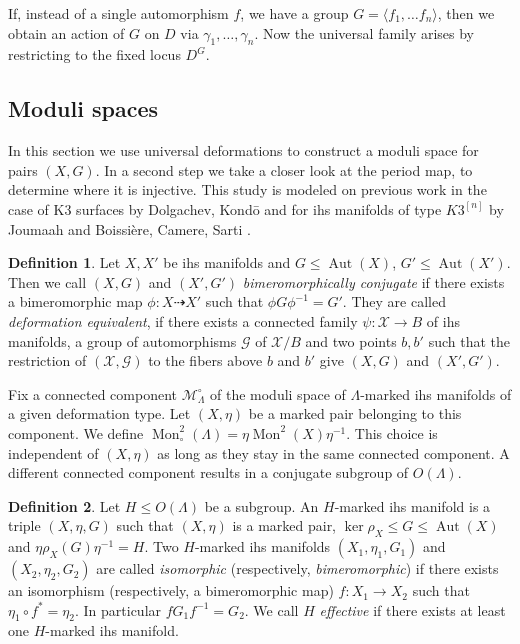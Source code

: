 \documentclass{amsart}
\theoremstyle{definition}
\newtheorem{definition}{Definition}[section]
\theoremstyle{plain}
\DeclareMathOperator{\Aut}{Aut}
\DeclareMathOperator{\Mo}{Mon}
\newcommand{\hskn}{K3^{\left[n\right]}}
\begin{document}
If, instead of a single automorphism $f$, we have a group $G=\langle f_1,\dots f_n \rangle$, then we obtain an action of $G$ on $D$ via $\gamma_1, \dots , \gamma_n$. Now the universal family arises by restricting to the fixed locus $D^G$.
\subsection{Moduli spaces}
In this section we use universal deformations to construct a moduli space for pairs $(X,G)$.
In a second step we take a closer look at the period map, to determine where it is injective. This study is modeled on previous work in the case of K3 surfaces by Dolgachev, Kond\={o} \cite{dolgachev-kondo} and for ihs manifolds of type $\hskn$ by Joumaah \cite{joumaa:order2} and Boissi\`ere, Camere, Sarti \cite{bcs:ball}.

\begin{definition}
 Let $X,X'$ be ihs manifolds and $G \leq \Aut(X)$, $G' \leq \Aut(X')$. Then we call $(X,G)$ and $(X',G')$ \emph{bimeromorphically conjugate}
 if there exists a bimeromorphic map $\phi\colon X \dashrightarrow X'$ such that $\phi G \phi^{-1} = G'$.
 They are called \emph{deformation equivalent}, if there exists a
 connected family $\psi \colon\mathcal{X} \rightarrow B$ of ihs manifolds, a group of automorphisms $\mathcal{G}$ of $\mathcal{X}/B$ and two points $b,b'$ such that the restriction of $(\mathcal{X},\mathcal{G})$ to the fibers above $b$ and $b'$ give $(X,G)$ and $(X',G')$.
 \end{definition}

 Fix a connected component $\mathcal{M}_\Lambda^\circ$ of the moduli space of $\Lambda$-marked ihs manifolds of a given deformation type.
 Let $(X,\eta)$ be a marked pair belonging to this component. We define $\Mo^2_\circ(\Lambda) = \eta \Mo^2(X)\eta^{-1}$.
 This choice is independent of $(X,\eta)$ as long as they stay in the same connected component.
 A different connected component results in a conjugate subgroup of $O(\Lambda)$.

 \begin{definition}
 Let $H \leq O(\Lambda)$ be a subgroup. An $H$-marked ihs manifold is a triple $(X,\eta,G)$ such that $(X,\eta)$ is a marked pair, $\ker \rho_X \leq G \leq \Aut(X)$ and $\eta\rho_X(G)\eta^{-1}=H$.
 Two $H$-marked ihs manifolds $(X_1,\eta_1,G_1)$ and $(X_2,\eta_2,G_2)$ are called \emph{isomorphic} (respectively, \emph{bimeromorphic})
 if there exists an isomorphism (respectively, a bimeromorphic map) $f\colon X_1 \rightarrow X_2$ such that
 $\eta_1 \circ f^* = \eta_2$. In particular $f G_1 f^{-1} = G_2$.
 We call $H$ \emph{effective} if there exists at least one $H$-marked ihs manifold.
 \end{definition}
\end{document}
